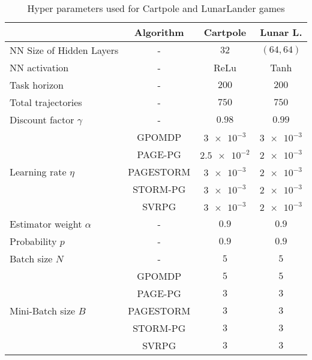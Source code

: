 \documentclass[10pt,twocolumn,letterpaper]{article}
\begin{document}
\begin{table}[h]
\begin{center} {\footnotesize
\begin{tabular}{p{2.5cm}ccc}
\hline
\multicolumn{1}{p{0.05\textwidth}}{} & \multicolumn{1}{c}{Algorithm} & \multicolumn{1}{c}{Cartpole} & \multicolumn{1}{c}{Lunar L.}\\
\hline
NN Size of Hidden Layers       & -              & $32$ & $(64, 64)$     \\
NN activation                  & -              & ReLu & Tanh \\
Task horizon                   & -              & $200$ & $200$ \\
Total trajectories             & -              & $750$ & $750$ \\
\hline
Discount factor $\gamma$       & -              & $0.98$ & $0.99$ \\
                               & {\tiny GPOMDP} & $\num{3e-3}$  & $\num{3e-3}$ \\
                               & {\tiny PAGE-PG} & $\num{2.5e-2}$ & $\num{2e-3}$ \\
 Learning rate $\eta$          & {\tiny PAGESTORM}  & $\num{3e-3}$ & $\num{2e-3}$   \\ 
                               & {\tiny STORM-PG}  & $\num{3e-3}$ & $\num{2e-3}$   \\
                               & {\tiny SVRPG}     & $\num{3e-3}$ & $\num{2e-3}$   \\

Estimator weight $\alpha$      & - & $0.9$ & $0.9$\\
Probability $p$                & - & $0.9$ & $0.9$\\
Batch size $N$                 & - & $5$ & $5$ \\
                               & {\tiny GPOMDP} & $5$ & $5$   \\
                               & {\tiny PAGE-PG} & $3$ & $3$   \\
Mini-Batch size $B$            & {\tiny PAGESTORM} & $3$ & $3$   \\
                               & {\tiny STORM-PG} & $3$ & $3$   \\
                               & {\tiny SVRPG} & $3$ & $3$   \\

\hline
\end{tabular} }
\end{center}
\caption{Hyper parameters used for Cartpole and LunarLander games}
\label{tb:hyper_parameters}
\end{table}
\end{document}

